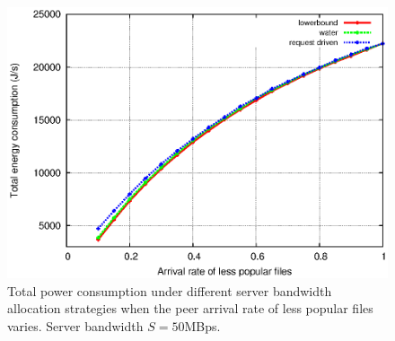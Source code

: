 \documentclass[conference]{IEEEtran}
\begin{document}
\begin{figure}[htp!]
\hfill
\centering
\begin{minipage}[b]{0.3\linewidth}
	\includegraphics[scale=0.4]{graphs/totalconsumption.eps}
	\caption{Total power consumption under different server bandwidth allocation strategies when the peer arrival rate of less popular files varies. Server bandwidth $S=50$MBps.}
	\label{fig:totalpop}
\end{minipage}
\label{fig:popularity}
\end{figure}
\end{document}
